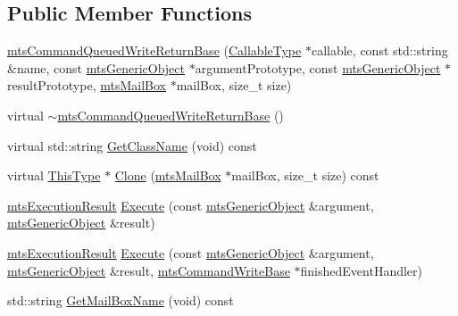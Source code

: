 \subsection*{Public Member Functions}
\begin{DoxyCompactItemize}
\item 
\hyperlink{classmts_command_queued_write_return_base_a972b13c4891a8cc227d8c59062a8d584}{mts\+Command\+Queued\+Write\+Return\+Base} (\hyperlink{classmts_command_queued_write_return_base_aa8635b9bab77a8e15f53f9f80415c420}{Callable\+Type} $\ast$callable, const std\+::string \&name, const \hyperlink{classmts_generic_object}{mts\+Generic\+Object} $\ast$argument\+Prototype, const \hyperlink{classmts_generic_object}{mts\+Generic\+Object} $\ast$result\+Prototype, \hyperlink{classmts_mail_box}{mts\+Mail\+Box} $\ast$mail\+Box, size\+\_\+t size)
\item 
virtual \hyperlink{classmts_command_queued_write_return_base_a73ca5f69553a4d5d8340478c4bfbf2b8}{$\sim$mts\+Command\+Queued\+Write\+Return\+Base} ()
\item 
virtual std\+::string \hyperlink{classmts_command_queued_write_return_base_af935b4426ac0e239aea6ab1dba2499c3}{Get\+Class\+Name} (void) const 
\item 
virtual \hyperlink{classmts_command_queued_write_return_base_af2f07528dc98cd88ab385e995f95a368}{This\+Type} $\ast$ \hyperlink{classmts_command_queued_write_return_base_a7e55f1214273ccfeaf3a32d64dd4b59a}{Clone} (\hyperlink{classmts_mail_box}{mts\+Mail\+Box} $\ast$mail\+Box, size\+\_\+t size) const 
\item 
\hyperlink{classmts_execution_result}{mts\+Execution\+Result} \hyperlink{classmts_command_queued_write_return_base_a9d972591c75d86c91e3b0746c35ff70c}{Execute} (const \hyperlink{classmts_generic_object}{mts\+Generic\+Object} \&argument, \hyperlink{classmts_generic_object}{mts\+Generic\+Object} \&result)
\item 
\hyperlink{classmts_execution_result}{mts\+Execution\+Result} \hyperlink{classmts_command_queued_write_return_base_a0da939240489bc0eee567225598aeb10}{Execute} (const \hyperlink{classmts_generic_object}{mts\+Generic\+Object} \&argument, \hyperlink{classmts_generic_object}{mts\+Generic\+Object} \&result, \hyperlink{classmts_command_write_base}{mts\+Command\+Write\+Base} $\ast$finished\+Event\+Handler)
\item 
std\+::string \hyperlink{classmts_command_queued_write_return_base_ab7ed86a72f83e9f4a8746d199c41670a}{Get\+Mail\+Box\+Name} (void) const 
\item 

\end{DoxyCompactItemize}
